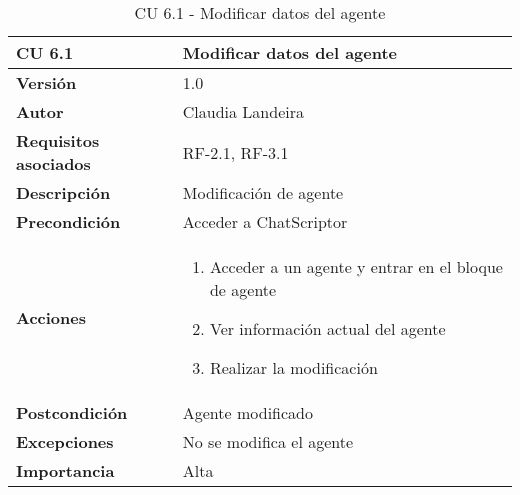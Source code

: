 \begin{table}[p]
	\centering
	\begin{tabularx}{\linewidth}{ p{} p{} }
		\toprule
		\textbf{CU 6.1}    & \textbf{Modificar datos del agente}\\
		\toprule
		\textbf{Versión}              & 1.0    \\
		\textbf{Autor}                & Claudia Landeira \\
		\textbf{Requisitos asociados} & RF-2.1, RF-3.1\\
		\textbf{Descripción}          & Modificación de agente\\
		\textbf{Precondición}         & Acceder a ChatScriptor\\
		\textbf{Acciones}             &
		\begin{enumerate}
			\def\labelenumi{\arabic{enumi}.}
			\tightlist
                \item Acceder a un agente y entrar en el bloque de agente
                \item Ver información actual del agente
                \item Realizar la modificación
		\end{enumerate}\\
		\textbf{Postcondición}        & Agente modificado  \\
		\textbf{Excepciones}          & No se modifica el agente \\
		\textbf{Importancia}          & Alta \\
		\bottomrule
	\end{tabularx}
	\caption{CU 6.1 - Modificar datos del agente}
\end{table}


